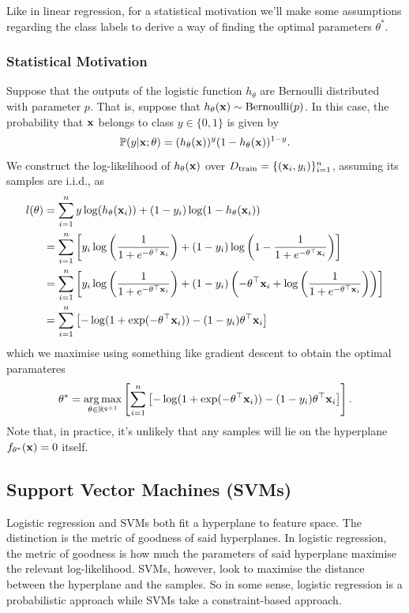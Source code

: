 \documentclass[11pt]{article}
\begin{document}
\noindent Like in linear regression, for a statistical motivation we'll make some assumptions regarding the class labels to derive a way of finding the optimal parameters $\theta^{*}$.

\subsubsection{Statistical Motivation}
Suppose that the outputs of the logistic function $h_{\theta}$ are Bernoulli distributed with parameter $p$. That is, suppose that $h_{\theta}(\mathbf{x})\sim\text{Bernoulli}(p)$. In this case, the probability that $\mathbf{x}$ belongs to class $y\in\{0, 1\}$ is given by
$$
\mathbb{P}(y|\mathbf{x};\theta)=(h_{\theta}(\mathbf{x}))^{y}(1-h_{\theta}(\mathbf{x}))^{1-y}.
$$
We construct the log-likelihood of $h_{\theta}(\mathbf{x})$ over $D_{\text{train}}=\{(\mathbf{x}_i,y_i)\}_{i=1}^n$, assuming its samples are i.i.d., as
\begin{align*}
    l(\theta)
    &=
    \sum_{i=1}^ny\log(h_{\theta}(\mathbf{x}_i))+(1-y_i)\log(1-h_{\theta}(\mathbf{x}_i))\\
    &=
    \sum_{i=1}^n\left[y_i\log\left(\frac{1}{1+e^{-\theta^{\top}\mathbf{x}_i}}\right)+(1-y_i)\log\left(1-\frac{1}{1+e^{-\theta^{\top}\mathbf{x}_i}}\right)\right]\\
    &=
    \sum_{i=1}^n\left[y_i\log\left(\frac{1}{1+e^{-\theta^{\top}\mathbf{x}_i}}\right)+(1-y_i)\left(-\theta^{\top}\mathbf{x}_i+\log\left(\frac{1}{1+e^{-\theta^{\top}\mathbf{x}_i}}\right)\right)\right]\\
    &=
    \sum_{i=1}^n\left[-\log(1+\exp(-\theta^{\top}\mathbf{x}_i))-(1-y_i)\theta^{\top}\mathbf{x}_i\right]
\end{align*}
which we maximise using something like gradient descent to obtain the optimal paramateres
$$
\theta^{*}
=
\operatorname*{arg\,max}_{\theta\in\mathbb{R}^{q+1}}\left[\sum_{i=1}^n\left[-\log(1+\exp(-\theta^{\top}\mathbf{x}_i))-(1-y_i)\theta^{\top}\mathbf{x}_i\right]\right].
$$
Note that, in practice, it's unlikely that any samples will lie on the hyperplane $f_{\theta^*}(\mathbf{x})=0$ itself.

\subsection{Support Vector Machines (SVMs)}
Logistic regression and SVMs both fit a hyperplane to feature space. The distinction is the metric of goodness of said hyperplanes. In logistic regression, the metric of goodness is how much the parameters of said hyperplane maximise the relevant log-likelihood. SVMs, however, look to maximise the distance between the hyperplane and the samples. So in some sense, logistic regression is a probabilistic approach while SVMs take a constraint-based approach.
\end{document}
